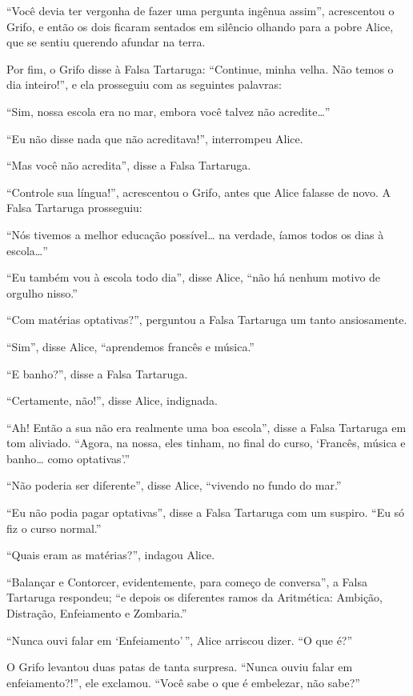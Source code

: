 ``Você devia ter vergonha de fazer uma pergunta ingênua assim'',
acrescentou o Grifo, e então os dois ficaram sentados em silêncio
olhando para a pobre Alice, que se sentiu querendo afundar na terra.

Por fim, o Grifo disse à Falsa Tartaruga: ``Continue, minha velha. Não
temos o dia inteiro!'', e ela prosseguiu com as seguintes palavras:

``Sim, nossa escola era no mar, embora você talvez não acredite\ldots{}''

``Eu não disse nada que não acreditava!'', interrompeu Alice.

``Mas você não acredita'', disse a Falsa Tartaruga.

``Controle sua língua!'', acrescentou o Grifo, antes que Alice falasse
de novo. A Falsa Tartaruga prosseguiu:

``Nós tivemos a melhor educação possível\ldots{} na verdade, íamos todos os
dias à escola\ldots{}''

``Eu também vou à escola todo dia'', disse Alice, ``não há nenhum motivo
de orgulho nisso.''

``Com matérias optativas?'', perguntou a Falsa Tartaruga um tanto
ansiosamente.

``Sim'', disse Alice, ``aprendemos francês e música.''

``E banho?'', disse a Falsa Tartaruga.

``Certamente, não!'', disse Alice, indignada.

``Ah! Então a sua não era realmente uma boa escola'', disse a Falsa
Tartaruga em tom aliviado. ``Agora, na nossa, eles tinham, no final do
curso, `Francês, música e banho\ldots{} como optativas'.''

``Não poderia ser diferente'', disse Alice, ``vivendo no fundo do mar.''

``Eu não podia pagar optativas'', disse a Falsa Tartaruga com um
suspiro. ``Eu só fiz o curso normal.''

``Quais eram as matérias?'', indagou Alice.

``Balançar e Contorcer, evidentemente, para começo de conversa'', a
Falsa Tartaruga respondeu; ``e depois os diferentes ramos da Aritmética:
Ambição, Distração, Enfeiamento e Zombaria.''

``Nunca ouvi falar em `Enfeiamento'\,'', Alice arriscou dizer. ``O que
é?''

O Grifo levantou duas patas de tanta surpresa. ``Nunca ouviu falar em
enfeiamento?!'', ele exclamou. ``Você sabe o que é embelezar, não sabe?''

